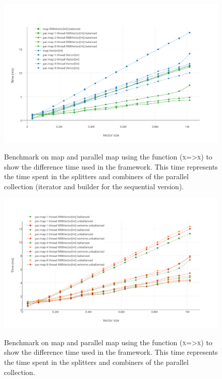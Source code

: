 \begin{figure}[h!]
  \centering
  \includegraphics[width=\textwidth]{Benchmarks/Parmap_balanced.pdf}
  \label{ParallelBenchmarks}
  \caption{Benchmark on map and parallel map using the function (\textsc{x=>x}) to show the difference time used in the framework. This time represents the time spent in the splitters and combiners of the parallel collection (iterator and builder for the sequential version).}
\end{figure}

\begin{figure}[h!]
  \centering
  \includegraphics[width=\textwidth]{Benchmarks/parmap_unbalanced.pdf}
  \label{ParallelUnbalancedBenchmarks}
  \caption{Benchmark on map and parallel map using the function (\textsc{x=>x}) to show the difference time used in the framework. This time represents the time spent in the splitters and combiners of the parallel collection.}
\end{figure}



